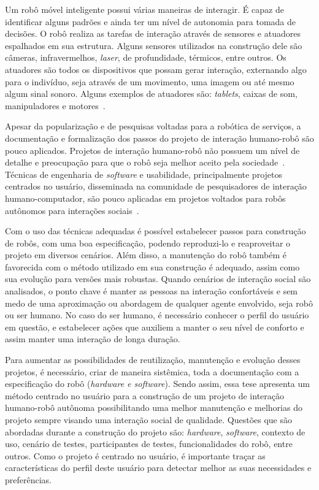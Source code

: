 Um robô móvel inteligente possui várias maneiras de interagir. É capaz de identificar alguns padrões e ainda ter um nível de autonomia para tomada de decisões. O robô realiza as tarefas de interação através de sensores e atuadores espalhados em sua estrutura. Alguns sensores utilizados na construção dele são câmeras, infravermelhos, \emph{laser}, de profundidade, térmicos, entre outros. Os atuadores são todos os dispositivos que possam gerar interação, externando algo para o indivíduo, seja através de um movimento, uma imagem ou até mesmo algum sinal sonoro. Alguns exemplos de atuadores são: \emph{tablets}, caixas de som, manipuladores e motores~\cite{looi:2012, choi:2014, dobra:2014}.

Apesar da popularização e de pesquisas voltadas para a robótica de serviços, a documentação e formalização dos passos do projeto de interação humano-robô são 
pouco aplicados. Projetos de interação humano-robô não possuem um nível de detalhe e preocupação para que o robô seja melhor aceito pela sociedade~\cite{alenljung:2017}. Técnicas de engenharia de \textit{software} e usabilidade, principalmente projetos centrados no usuário, disseminada na comunidade de pesquisadores de interação humano-computador, são pouco aplicadas em projetos voltados para robôs autônomos para interações sociais~\cite{alenljung:2017}.

Com o uso das técnicas adequadas é possível estabelecer passos para construção de robôs, com uma boa especificação, podendo reproduzi-lo e reaproveitar o projeto em diversos cenários. Além disso, a manutenção do robô também é favorecida com o método utilizado em sua construção é adequado, assim como sua evolução para versões mais robustas. Quando cenários de interação social são analisados, o ponto chave é manter as pessoas na interação confortáveis e sem medo de uma aproximação ou abordagem de qualquer agente envolvido, seja robô ou ser humano. No caso do ser humano, é necessário conhecer o perfil do usuário em questão, e estabelecer ações que auxiliem a manter o seu nível de conforto e assim manter uma interação de longa duração.

Para aumentar as possibilidades de reutilização, manutenção e evolução desses projetos, é necessário, criar de maneira sistêmica, toda a documentação com a especificação do robô (\emph{hardware e software}). Sendo assim, essa tese apresenta um método centrado no usuário para a construção de um projeto de interação humano-robô autônoma possibilitando uma melhor manutenção e melhorias do projeto sempre visando uma interação social de qualidade. Questões que são abordadas durante a construção do projeto são: \emph{hardware}, \emph{software}, contexto de uso, cenário de testes, participantes de testes, funcionalidades do robô, entre outros. Como o projeto é centrado no usuário, é importante traçar as características do perfil deste usuário para detectar melhor as suas necessidades e preferências.

